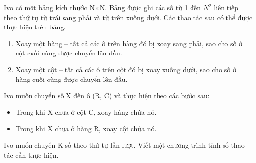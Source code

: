 Ivo có một bảng kích thước N×N. Bảng được ghi các số từ 1 đến $N^{2}$ liên tiếp theo thứ tự từ trái sang phải và từ trên xuống dưới. Các thao tác sau có thể được thực hiện trên bảng:
\begin{enumerate}
	\item Xoay một hàng – tất cả các ô trên hàng đó bị xoay sang phải, sao cho số ở cột cuối cùng được chuyển lên đầu.
	\item Xoay một cột – tất cả các ô trên cột đó bị xoay xuống dưới, sao cho số ở hàng cuối cùng được chuyển lên đầu.
\end{enumerate}

Ivo muốn chuyển số X đến ô (R, C) và thực hiện theo các bước sau:
\begin{itemize}
	\item Trong khi X chưa ở cột C, xoay hàng chứa nó.
	\item Trong khi X chưa ở hàng R, xoay cột chứa nó.
\end{itemize}

Ivo muốn chuyển K số theo thứ tự lần lượt. Viết một chương trình tính số thao tác cần thực hiện.